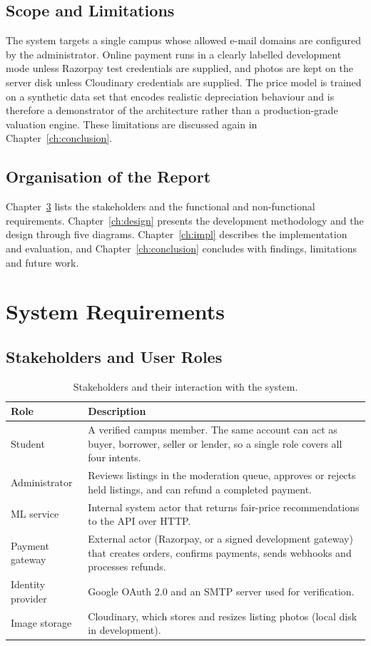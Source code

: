 \documentclass[11pt,letterpaper,oneside]{report}
\begin{document}
\section{Scope and Limitations}
The system targets a single campus whose allowed e-mail domains are configured by the administrator.
Online payment runs in a clearly labelled development mode unless Razorpay test credentials
are supplied, and photos are kept on the server disk unless Cloudinary credentials are supplied.
The price model is trained on a synthetic data set that encodes realistic depreciation behaviour and
is therefore a demonstrator of the architecture rather than a production-grade valuation engine.
These limitations are discussed again in Chapter~\ref{ch:conclusion}.

\section{Organisation of the Report}
Chapter~\ref{ch:req} lists the stakeholders and the functional and non-functional requirements.
Chapter~\ref{ch:design} presents the development methodology and the design through five diagrams.
Chapter~\ref{ch:impl} describes the implementation and evaluation, and Chapter~\ref{ch:conclusion}
concludes with findings, limitations and future work.

\chapter{System Requirements}\label{ch:req}

\section{Stakeholders and User Roles}
\begin{table}[H]
\centering
\caption{Stakeholders and their interaction with the system.}\label{tab:stake}
\small
\begin{tabularx}{\textwidth}{@{}L{2.6cm}X@{}}
\toprule
\textbf{Role} & \textbf{Description}\\
\midrule
Student & A verified campus member. The same account can act as buyer, borrower, seller or
lender, so a single role covers all four intents.\\
Administrator & Reviews listings in the moderation queue, approves or rejects held listings, and
can refund a completed payment.\\
ML service & Internal system actor that returns fair-price recommendations to the API over HTTP.\\
Payment gateway & External actor (Razorpay, or a signed development gateway) that creates orders,
confirms payments, sends webhooks and processes refunds.\\
Identity provider & Google OAuth 2.0 and an SMTP server used for verification.\\
Image storage & Cloudinary, which stores and resizes listing photos (local disk in development).\\
\bottomrule
\end{tabularx}
\end{table}
\end{document}
